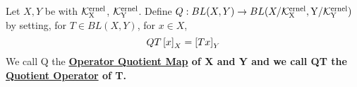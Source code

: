 \label{def:quotientoperator}
\newcommand{\QuotientOperator}[0]{
    \bf \hyperref[def:quotientoperator]{Quotient Operator} \rm
}
\newcommand{\OperatorQuotientMap}[0]{
    \bf \hyperref[def:quotientoperator]{Operator Quotient Map} \rm
}
\begin{df}
    Let $X,Y$ be \SeminormedSpaces
    with \SeminormKernels $\bf\mathcal{K}\rm^{ernel}_X$, $\bf\mathcal{K}\rm^{ernel}_Y$. 
    Define $Q:BL(X,Y) \to BL(X/\bf\mathcal{K}\rm^{ernel}_X, Y/\bf\mathcal{K}\rm^{ernel}_Y)$ by 
    setting, for $T \in BL(X,Y)$, 
    for $x \in X$, 
    \begin{equation}
    QT\left[ x \right]_X=\left[ Tx \right]_Y
    \end{equation}
    We call Q the \OperatorQuotientMap of X and Y and
    we call QT the \QuotientOperator of T. 
\end{df}


